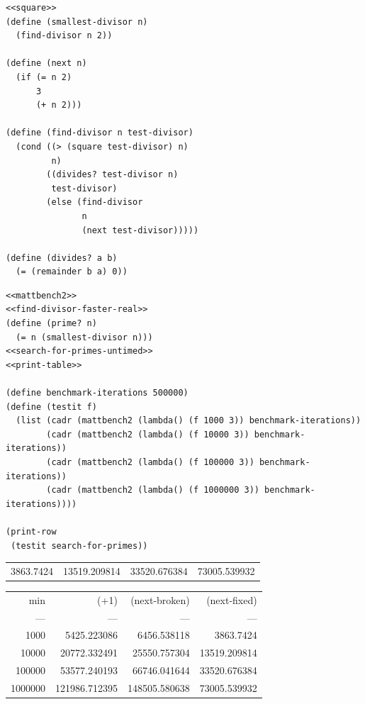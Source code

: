 \documentclass[final,fleqn,titlepage,twoside]{article}
\begin{document}
\begin{verbatim}
<<square>>
(define (smallest-divisor n)
  (find-divisor n 2))

(define (next n)
  (if (= n 2)
      3
      (+ n 2)))

(define (find-divisor n test-divisor)
  (cond ((> (square test-divisor) n) 
         n)
        ((divides? test-divisor n) 
         test-divisor)
        (else (find-divisor 
               n 
               (next test-divisor)))))

(define (divides? a b)
  (= (remainder b a) 0))
\end{verbatim}
\begin{verbatim}
<<mattbench2>>
<<find-divisor-faster-real>>
(define (prime? n)
  (= n (smallest-divisor n)))
<<search-for-primes-untimed>>
<<print-table>>

(define benchmark-iterations 500000)
(define (testit f)
  (list (cadr (mattbench2 (lambda() (f 1000 3)) benchmark-iterations))
        (cadr (mattbench2 (lambda() (f 10000 3)) benchmark-iterations))
        (cadr (mattbench2 (lambda() (f 100000 3)) benchmark-iterations))
        (cadr (mattbench2 (lambda() (f 1000000 3)) benchmark-iterations))))

(print-row
 (testit search-for-primes))
\end{verbatim}

\begin{table}[htbp]
\label{1-22-smdff}
\centering
\begin{tabular}{rrrr}
3863.7424 & 13519.209814 & 33520.676384 & 73005.539932\\[0pt]
\end{tabular}
\end{table}

\begin{center}
\begin{tabular}{rrrr}
min & (+1) & (next-broken) & (next-fixed)\\[0pt]
--- & --- & --- & ---\\[0pt]
1000 & 5425.223086 & 6456.538118 & 3863.7424\\[0pt]
10000 & 20772.332491 & 25550.757304 & 13519.209814\\[0pt]
100000 & 53577.240193 & 66746.041644 & 33520.676384\\[0pt]
1000000 & 121986.712395 & 148505.580638 & 73005.539932\\[0pt]
\end{tabular}
\end{center}
\end{document}
